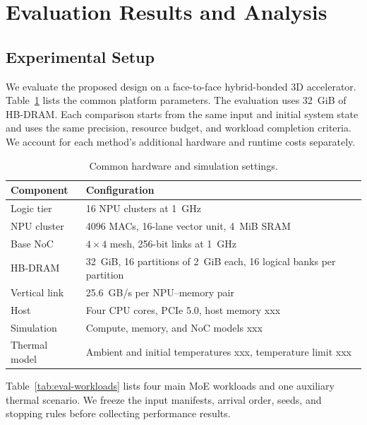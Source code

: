 \documentclass[conference,10pt]{IEEEtran}
\begin{document}

\FloatBarrier

\section{Evaluation Results and Analysis}
\label{sec:experiment}

\subsection{Experimental Setup}

We evaluate the proposed design on a face-to-face hybrid-bonded 3D accelerator. Table~\ref{tab:eval-platform} lists the common platform parameters. The evaluation uses 32~GiB of HB-DRAM. Each comparison starts from the same input and initial system state and uses the same precision, resource budget, and workload completion criteria. We account for each method's additional hardware and runtime costs separately.

\begin{table}[t]
\caption{Common hardware and simulation settings.}
\label{tab:eval-platform}
\centering\small
\begin{tabular}{@{}lp{}@{}}
\hline
Component & Configuration \\
\hline
Logic tier & 16 NPU clusters at 1~GHz \\
NPU cluster & 4096 MACs, 16-lane vector unit, 4~MiB SRAM \\
Base NoC & $4\times4$ mesh, 256-bit links at 1~GHz \\
HB-DRAM & 32~GiB, 16 partitions of 2~GiB each, 16 logical banks per partition \\
Vertical link & 25.6~GB/s per NPU--memory pair \\
Host & Four CPU cores, PCIe 5.0, host memory xxx \\
Simulation & Compute, memory, and NoC models xxx \\
Thermal model & Ambient and initial temperatures xxx, temperature limit xxx \\
\hline
\end{tabular}
\end{table}

Table~\ref{tab:eval-workloads} lists four main MoE workloads and one auxiliary thermal scenario. We freeze the input manifests, arrival order, seeds, and stopping rules before collecting performance results.
\end{document}

